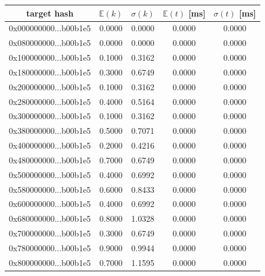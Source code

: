 \documentclass[12pt, a4paper]{article}
\begin{document}
\begin{table}[H]
    \centering
    \begin{tabular}{|c|c|c|c|c|} \hline
    target hash  & $\mathbb{E}(k)$ & $\sigma(k) $ & $\mathbb{E}(t)$ [ms] & $\sigma(t)$ [ms] \\ \hline
    0x000000000...b00b1e5 &         0.0000 &         0.0000 &         0.0000 &        0.0000 \\ \hline
0x080000000...b00b1e5 &         0.0000 &         0.0000 &         0.0000 &        0.0000 \\ \hline
0x100000000...b00b1e5 &         0.1000 &         0.3162 &         0.0000 &        0.0000 \\ \hline
0x180000000...b00b1e5 &         0.3000 &         0.6749 &         0.0000 &        0.0000 \\ \hline
0x200000000...b00b1e5 &         0.1000 &         0.3162 &         0.0000 &        0.0000 \\ \hline
0x280000000...b00b1e5 &         0.4000 &         0.5164 &         0.0000 &        0.0000 \\ \hline
0x300000000...b00b1e5 &         0.1000 &         0.3162 &         0.0000 &        0.0000 \\ \hline
0x380000000...b00b1e5 &         0.5000 &         0.7071 &         0.0000 &        0.0000 \\ \hline
0x400000000...b00b1e5 &         0.2000 &         0.4216 &         0.0000 &        0.0000 \\ \hline
0x480000000...b00b1e5 &         0.7000 &         0.6749 &         0.0000 &        0.0000 \\ \hline
0x500000000...b00b1e5 &         0.4000 &         0.6992 &         0.0000 &        0.0000 \\ \hline
0x580000000...b00b1e5 &         0.6000 &         0.8433 &         0.0000 &        0.0000 \\ \hline
0x600000000...b00b1e5 &         0.4000 &         0.6992 &         0.0000 &        0.0000 \\ \hline
0x680000000...b00b1e5 &         0.8000 &         1.0328 &         0.0000 &        0.0000 \\ \hline
0x700000000...b00b1e5 &         0.3000 &         0.6749 &         0.0000 &        0.0000 \\ \hline
0x780000000...b00b1e5 &         0.9000 &         0.9944 &         0.0000 &        0.0000 \\ \hline
0x800000000...b00b1e5 &         0.7000 &         1.1595 &         0.0000 &        0.0000 \\ \hline

\end{tabular}
\end{table}
\end{document}
